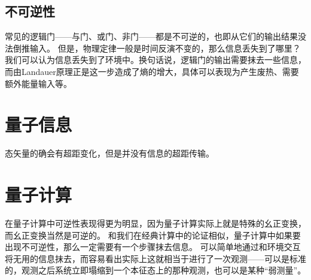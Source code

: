 \documentclass[UTF8, a4paper]{ctexart}
\begin{document}
\subsection{不可逆性}

常见的逻辑门——与门、或门、非门——都是不可逆的，也即从它们的输出结果没法倒推输入。
但是，物理定律一般是时间反演不变的，那么信息丢失到了哪里？我们可以认为信息丢失到了环境中。换句话说，逻辑门的输出需要抹去一些信息，而由Landauer原理正是这一步造成了熵的增大，具体可以表现为产生废热、需要额外能量输入等。

\section{量子信息}

态矢量的确会有超距变化，但是并没有信息的超距传输。

\section{量子计算}

在量子计算中可逆性表现得更为明显，因为量子计算实际上就是特殊的幺正变换，而幺正变换当然是可逆的。
和我们在经典计算中的论证相似，量子计算中如果要出现不可逆性，那么一定需要有一个步骤抹去信息。
可以简单地通过和环境交互将无用的信息抹去，而容易看出实际上这就相当于进行了一次观测——可以是标准的，观测之后系统立即塌缩到一个本征态上的那种观测，也可以是某种“弱测量”。
\end{document}
